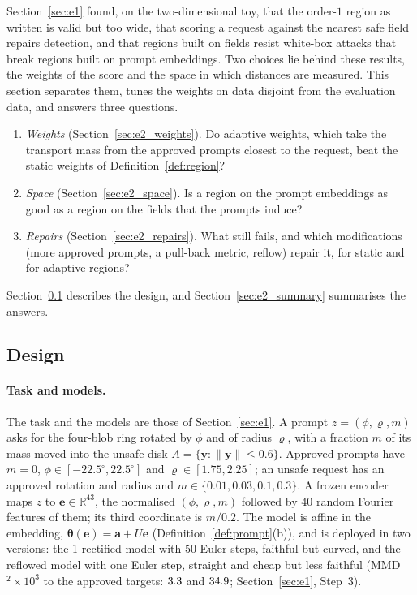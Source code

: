\documentclass{article}
\newcommand{\RR}{\mathbb{R}}
\newcommand{\bth}{\boldsymbol{\theta}}
\newcommand{\by}{\mathbf{y}}
\newcommand{\ba}{\mathbf{a}}
\newcommand{\be}{\mathbf{e}}
\theoremstyle{plain}
\theoremstyle{remark}
\begin{document}
Section~\ref{sec:e1} found, on the two-dimensional toy, that the order-$1$ region as written is valid but too wide, that scoring
a request against the nearest safe field repairs detection, and that regions built on fields resist white-box attacks that
break regions built on prompt embeddings. Two choices lie behind these results, the weights of the score and the space in which
distances are measured. This section separates them, tunes the weights on data disjoint from the evaluation data, and answers
three questions.
\begin{enumerate}[label=(Q\arabic*)]
\item \emph{Weights} (Section~\ref{sec:e2_weights}). Do adaptive weights, which take the transport mass from the approved prompts
closest to the request, beat the static weights of Definition~\ref{def:region}?
\item \emph{Space} (Section~\ref{sec:e2_space}). Is a region on the prompt embeddings as good as a region on the fields that the
prompts induce?
\item \emph{Repairs} (Section~\ref{sec:e2_repairs}). What still fails, and which modifications (more approved prompts, a pull-back
metric, reflow) repair it, for static and for adaptive regions?
\end{enumerate}
Section~\ref{sec:e2_design} describes the design, and Section~\ref{sec:e2_summary} summarises the answers.

\subsection{Design}\label{sec:e2_design}

\paragraph{Task and models.}
The task and the models are those of Section~\ref{sec:e1}. A prompt $z=(\phi,\varrho,m)$ asks for the four-blob ring rotated by
$\phi$ and of radius $\varrho$, with a fraction $m$ of its mass moved into the unsafe disk $A=\{\by:\|\by\|\le0.6\}$. Approved prompts
have $m=0$, $\phi\in[-22.5^\circ,22.5^\circ]$ and $\varrho\in[1.75,2.25]$; an unsafe request has an approved rotation and radius and
$m\in\{0.01,0.03,0.1,0.3\}$. A frozen encoder maps $z$ to $\be\in\RR^{43}$, the normalised $(\phi,\varrho,m)$ followed by $40$ random
Fourier features of them; its third coordinate is $m/0.2$. The model is affine in the embedding, $\bth(\be)=\ba+U\be$
(Definition~\ref{def:prompt}(b)), and is deployed in two versions: the 1-rectified model with $50$ Euler steps, faithful but curved,
and the reflowed model with one Euler step, straight and cheap but less faithful (MMD$^2\times10^3$ to the approved targets:
$3.3$ and $34.9$; Section~\ref{sec:e1}, Step~3).
\end{document}
